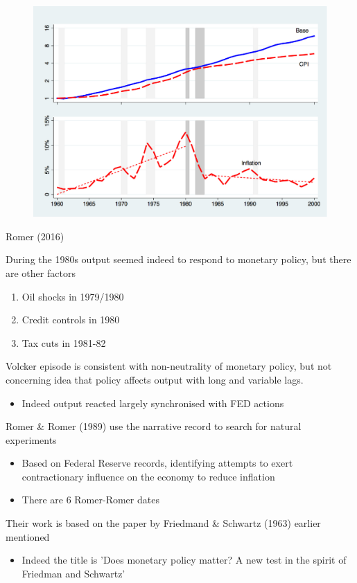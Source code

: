 \documentclass{beamer}
\begin{document}
\begin{frame}
  \begin{figure}
    \includegraphics[scale=.7]{romer.eps}
  \end{figure}
  Romer (2016)
\end{frame}

\begin{frame}
  During the 1980s output seemed indeed to respond to monetary policy, but there are other factors
  \begin{enumerate}
    \item Oil shocks in 1979/1980
    \item Credit controls in 1980
    \item Tax cuts in 1981-82
  \end{enumerate}
  \medskip
  Volcker episode is consistent with non-neutrality of monetary policy, but not concerning idea that policy affects output with long and variable lags.
  \begin{itemize}
    \item Indeed output reacted largely synchronised with FED actions
  \end{itemize}  
\end{frame}

\begin{frame}
  Romer \& Romer (1989) use the narrative record to search for natural experiments
  \begin{itemize}
    \item Based on Federal Reserve records, identifying attempts to exert contractionary influence on the economy to reduce inflation
    \item There are 6 Romer-Romer dates
  \end{itemize}
  \medskip
  Their work is based on the paper by Friedmand \& Schwartz (1963) earlier mentioned
  \begin{itemize}
    \item Indeed the title is 'Does monetary policy matter? A new test in the spirit of Friedman and Schwartz'
  \end{itemize}    
\end{frame}
\end{document}
